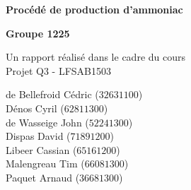 \begin{titlepage}
    \begin{center}
        \vspace*{1cm}
        
        \Huge
	\textbf{Procédé de production d'ammoniac}
        
        \vspace{1cm}
        
        \textbf{Groupe 1225}
        
        \vspace{0.5cm}
        
        \large
        Un rapport réalisé dans le cadre du cours\\
        
        \LARGE
        Projet Q3 - LFSAB1503
        \vspace{0,5cm}
        
        

        \vfill 
        \large
        
	de Bellefroid Cédric ($32631100$) \\
	Dénos Cyril ($62811300$) \\
        de Wasseige John ($52241300$) \\
	Dispas David ($71891200$) \\
	Libeer Cassian  ($65161200$) \\
        Malengreau Tim ($66081300$) \\
	Paquet Arnaud ($36681300$) \\       
        
    \end{center}
\end{titlepage}
